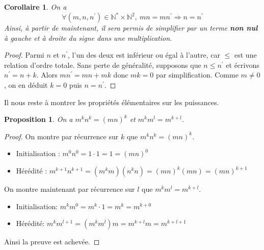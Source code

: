 \documentclass[french]{book}
\theoremstyle{plain}
\newtheorem{prop}{Proposition}[chapter]
\newtheorem{cor}{Corollaire}[chapter]
\theoremstyle{definition}
\theoremstyle{remark}
\begin{document}
\begin{cor}
	On a $$\forall(m,n,n^{\prime})\in\mathbb{N}^{*}\times\mathbb{N}^{2},\ mn=mn^{\prime}\Rightarrow n=n^{\prime}$$
Ainsi, à partir de maintenant, il sera permis de simplifier par un terme \textbf{non nul} à gauche et à droite du signe dans une multiplication.
\end{cor}
\begin{proof}
	Parmi $n$ et $n^{\prime}$, l'un des deux est inférieur ou égal à l'autre, car $\leqslant$ est une relation d'ordre totale. Sans perte de généralité, supposons que $n\leqslant n^{\prime}$ et écrivons $n^{\prime}=n+k$. Alors $mn^{\prime}=mn+mk$ donc $mk=0$ par simplification. Comme $m\ne0$, on en déduit $k=0$ puis $n=n^{\prime}$.
\end{proof}
Il nous reste à montrer les propriétés élémentaires sur les puissances.
\begin{prop}
	On a $m^{k}n^{k}=(mn)^{k}$ et $m^{k}m^{l}=m^{k+l}$.
\end{prop}
\begin{proof}
	On montre par récurrence sur $k$ que $m^{k}n^{k}=(mn)^{k}$.
\begin{itemize}
	\item Initialisation : $m^{0}n^{0}=1\cdot1=1=(mn)^{0}$
	\item Hérédité : $m^{k+1}n^{k+1}=(m^{k}m)(n^{k}n)=(mn)^{k}(mn)=(mn)^{k+1}$
\end{itemize}
On montre maintenant par récurrence sur $l$ que \(m^{k}m^{l}=m^{k+l}.\)
\begin{itemize}
	\item Initialisation: $m^{k}m^{0}=m^{k}\cdot1=m^{k}=m^{k+0}$
	\item Hérédité: $m^{k}m^{l+1}=(m^{k}m^{l})m=m^{k+l}m=m^{k+l+1}$
\end{itemize}
Ainsi la preuve est achevée.
\end{proof}
\end{document}
